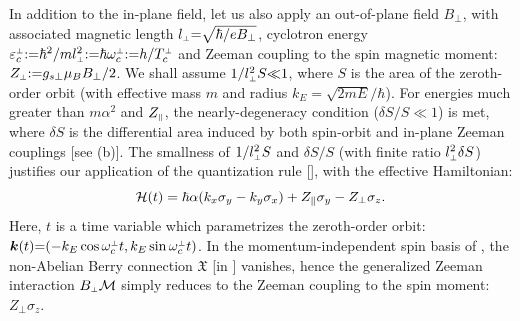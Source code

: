 \documentclass[aps, showpacs, twocolumn, notitlepage, superscriptaddress]{revtex4-1}
\begin{document}
In addition to the in-plane field, let us also apply an out-of-plane field $B_{\perp}$, with associated magnetic length $l_{\scriptscriptstyle{\perp}}{=}\sqrt{\hbar/eB_{\perp}}$, cyclotron energy $\varepsilon^{\scriptscriptstyle{\perp}}_c{:}{=}\hbar^2/ml_{\scriptscriptstyle{\perp}}^2{:}{=}\hbar \omega_c^{\scriptscriptstyle{\perp}}{:}{=}h/T_c^{\scriptscriptstyle{\perp}}$ and Zeeman coupling to the spin magnetic moment:  $Z_{\scriptscriptstyle{\perp}}{:}{=}{g_{s\perp}}\mu_B B_{\perp}/2$. We shall assume  $1/l_{\scriptscriptstyle{\perp}}^2S{\ll}1$, where $S$ is the area of the zeroth-order orbit (with effective mass $m$ and radius $k_E{=}\sqrt{2mE}/\hbar$). For energies much greater than $m\alpha^2$ and $Z_{\scriptscriptstyle{\parallel}}$, the nearly-degeneracy condition ($\delta S/S{\ll}1$) is met, where $\delta S$ is the differential area induced by both spin-orbit and in-plane Zeeman couplings [see (b)].  The smallness of $1/l_{\scriptscriptstyle{\perp}}^2S$ and $\delta S/S$ (with finite ratio $l_{\scriptscriptstyle{\perp}}^2\delta S$) justifies our application of the quantization rule [], with the effective Hamiltonian: 
\begin{equation}
{\cal H}(t)=\hbar\alpha(k_{x}\sigma_{y}-k_{y}\sigma_{x})+Z_\parallel\sigma_{y}-Z_\perp\sigma_{z}.\label{calHRZ}
\end{equation}
Here, $t$ is a time variable which parametrizes the zeroth-order orbit:
$\boldsymbol{k}(t){=}({-}k_E \cos \omega_c^{\scriptscriptstyle{\perp}} t, k_E \sin \omega_c^{\scriptscriptstyle{\perp}} t )$. In the momentum-independent spin basis of , the non-Abelian Berry connection $\mathfrak{X}$ [in ]  vanishes, hence the generalized Zeeman interaction $B_{\scriptscriptstyle{\perp}}{\cal M}$ simply reduces to the Zeeman coupling to the spin  moment: $Z_\perp\sigma_{z}$.
\end{document}
